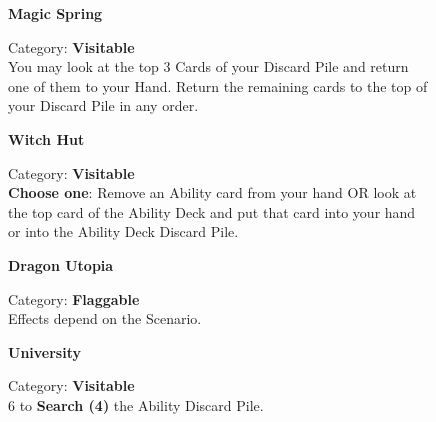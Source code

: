 \begin{figure}[H]
  \begin{minipage}[t]{0.47\textwidth}
    \vspace{0pt}
    \centering
    \textbf{Magic Spring}\par
    \caption{\small Category: \textbf{Visitable}\\
      You may look at the top 3 Cards of your Discard Pile and return one of them to your Hand.
      Return the remaining cards to the top of your Discard Pile in any order.}
  \end{minipage}\hfill
  \begin{minipage}[t]{0.47\textwidth}
    \vspace{0pt}
    \centering
    \phantom{j}\textbf{Witch Hut}\par
    \caption{\small Category: \textbf{Visitable}\\
      \textbf{Choose one}: Remove an Ability card from your hand OR look at the top card of the Ability Deck and put that card into your hand or into the Ability Deck Discard Pile.}
  \end{minipage}
\end{figure}

\begin{figure}[H]
  \begin{minipage}[t]{0.47\textwidth}
    \vspace{0pt}
    \centering
    \textbf{Dragon Utopia}\par
    \caption{\small Category: \textbf{Flaggable}\\Effects depend on the Scenario.}
  \end{minipage}\hfill
  \begin{minipage}[t]{0.47\textwidth}
    \vspace{0pt}
    \centering
    \textbf{University}\par
    \caption{\small Category: \textbf{Visitable}\\
       6  to \textbf{Search (4)} the Ability Discard Pile.}
  \end{minipage}
\end{figure}

